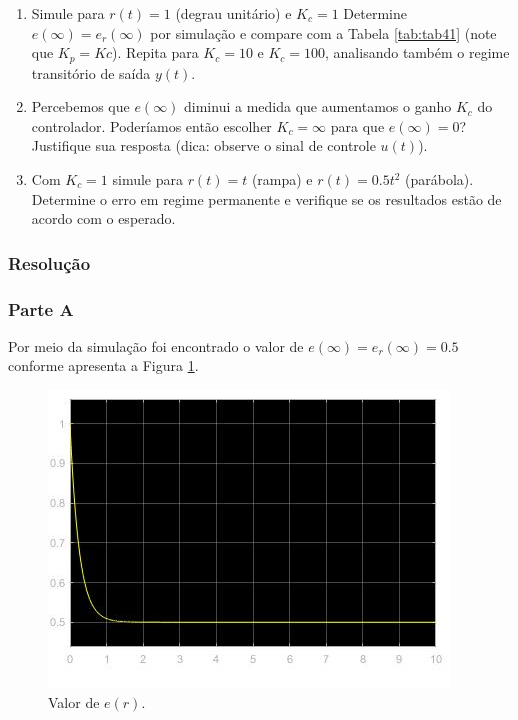 \documentclass[
]{book}
\providecommand{\tightlist}{%
  \setlength{\itemsep}{0pt}\setlength{\parskip}{0pt}}
\theoremstyle{definition}
\theoremstyle{definition}
\theoremstyle{definition}
\theoremstyle{remark}
\begin{document}
\begin{enumerate}
\def\labelenumi{\alph{enumi}.}
\tightlist
\item
  Simule para \(r(t) = 1\) (degrau unitário) e \(K_c = 1\) Determine \(e(\infty) = e_r(\infty)\) por simulação e compare com a Tabela \ref{tab:tab41} (note que \(K_p = Kc\)). Repita para \(K_c = 10\) e \(K_c = 100\), analisando também o regime transitório de saída \(y(t)\).
\item
  Percebemos que \(e(\infty)\) diminui a medida que aumentamos o ganho \(K_c\) do controlador. Poderíamos então escolher \(K_c = \infty\) para que \(e(\infty) = 0\)? Justifique sua resposta (dica: observe o sinal de controle \(u(t)\)).
\item
  Com \(K_c = 1\) simule para \(r(t) = t\) (rampa) e \(r(t) = 0.5t^2\) (parábola). Determine o erro em regime permanente e verifique se os resultados estão de acordo com o esperado.
\end{enumerate}

\hypertarget{resoluuxe7uxe3o-10}{%
\subsubsection*{Resolução}\label{resoluuxe7uxe3o-10}}

\hypertarget{parte-a-1}{%
\subsubsection*{Parte A}\label{parte-a-1}}

Por meio da simulação foi encontrado o valor de \(e(\infty) = e_r(\infty) = 0.5\) conforme apresenta a Figura \ref{fig:fig41A1}.

\begin{figure}
\includegraphics[width=0.8\linewidth]{Imagens/Lab4/Resolução/prob1A1} \caption{Valor de $e(r)$.}\label{fig:fig41A1}
\end{figure}
\end{document}
